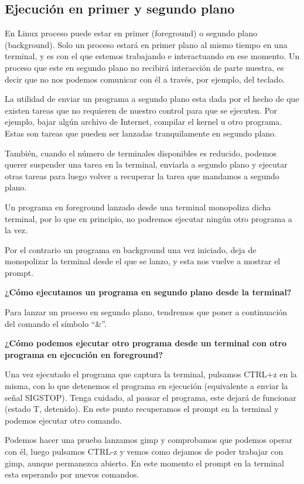 \documentclass[12pt]{article}
\begin{document}
\subsection*{Ejecución en primer y segundo plano}

En Linux proceso puede estar en primer (foreground) o segundo plano
(background). Solo un proceso estará en primer plano al mismo tiempo en
una terminal, y es con el que estemos trabajando e interactuando en ese 
momento. Un proceso que este en segundo plano no recibirá interacción  
de parte nuestra, es decir que no nos podemos comunicar con él 
a través, por ejemplo, del teclado. 

La utilidad de enviar un programa a 
segundo plano esta dada por el hecho de que existen tareas que no 
requieren de nuestro control para que se ejecuten. Por ejemplo, bajar 
algún archivo de Internet, compilar el kernel u otro programa. Estas son 
tareas que pueden ser lanzadas tranquilamente en segundo plano. 

También, cuando el número de terminales disponibles es reducido,  
podemos querer suspender una tarea en la terminal, enviarla a 
segundo plano y ejecutar otras tareas para luego volver a recuperar la 
tarea que mandamos a segundo plano. 

Un programa en foreground lanzado desde una terminal monopoliza dicha
terminal, por lo que en principio, no podremos ejecutar ningún otro 
programa a la vez. 

Por el contrario un programa en background una vez iniciado, deja de 
monopolizar la terminal desde el que se lanzo, y esta nos vuelve a 
mostrar el prompt.

{\bf ¿Cómo ejecutamos un programa en segundo plano desde la terminal? }

Para lanzar un proceso en segundo plano, tendremos que poner a continuación 
del comando el símbolo ``\&''. 


{\bf ¿Cómo podemos ejecutar otro programa desde un terminal con otro
 programa en ejecución en foreground?}

Una vez ejecutado el programa que captura la terminal, pulsamos CTRL+z 
en la misma, con lo que detenemos el programa en ejecución (equivalente
a enviar la señal SIGSTOP). Tenga cuidado, al pausar el programa, este 
dejará de funcionar (estado T, detenido). En este punto recuperamos 
el prompt en la terminal y podemos ejecutar otro comando. 

 Podemos hacer una prueba lanzamos gimp y comprobamos que podemos operar con él, luego pulsamos CTRL-z y vemos como dejamos de poder trabajar con gimp, aunque permanezca abierto. En este momento el prompt en la terminal esta 
esperando por nuevos comandos.  
\end{document}
